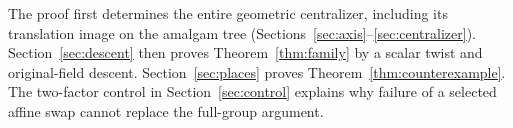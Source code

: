 The proof first determines the entire geometric centralizer, including
its translation image on the amalgam tree
(Sections~\ref{sec:axis}--\ref{sec:centralizer}).
Section~\ref{sec:descent} then proves
Theorem~\ref{thm:family} by a scalar twist and original-field descent.
Section~\ref{sec:places} proves Theorem~\ref{thm:counterexample}.
The two-factor control in Section~\ref{sec:control} explains why
failure of a selected affine swap cannot replace the full-group
argument.
